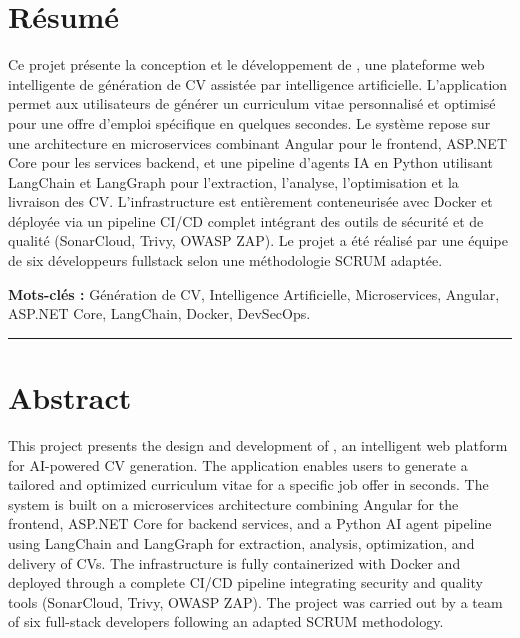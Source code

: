 \chapter*{Résumé}

Ce projet présente la conception et le développement de \projectname{}, une plateforme web intelligente de génération de CV assistée par intelligence artificielle. L'application permet aux utilisateurs de générer un curriculum vitae personnalisé et optimisé pour une offre d'emploi spécifique en quelques secondes. Le système repose sur une architecture en microservices combinant Angular pour le frontend, ASP.NET Core pour les services backend, et une pipeline d'agents IA en Python utilisant LangChain et LangGraph pour l'extraction, l'analyse, l'optimisation et la livraison des CV. L'infrastructure est entièrement conteneurisée avec Docker et déployée via un pipeline CI/CD complet intégrant des outils de sécurité et de qualité (SonarCloud, Trivy, OWASP ZAP). Le projet a été réalisé par une équipe de six développeurs fullstack selon une méthodologie SCRUM adaptée.

\vspace{0.5cm}
\textbf{Mots-clés :} Génération de CV, Intelligence Artificielle, Microservices, Angular, ASP.NET Core, LangChain, Docker, DevSecOps.

\vspace{1cm}
\begin{center}
\rule{0.5\textwidth}{0.4pt}
\end{center}
\vspace{1cm}

\chapter*{Abstract}

This project presents the design and development of \projectname{}, an intelligent web platform for AI-powered CV generation. The application enables users to generate a tailored and optimized curriculum vitae for a specific job offer in seconds. The system is built on a microservices architecture combining Angular for the frontend, ASP.NET Core for backend services, and a Python AI agent pipeline using LangChain and LangGraph for extraction, analysis, optimization, and delivery of CVs. The infrastructure is fully containerized with Docker and deployed through a complete CI/CD pipeline integrating security and quality tools (SonarCloud, Trivy, OWASP ZAP). The project was carried out by a team of six full-stack developers following an adapted SCRUM methodology.

